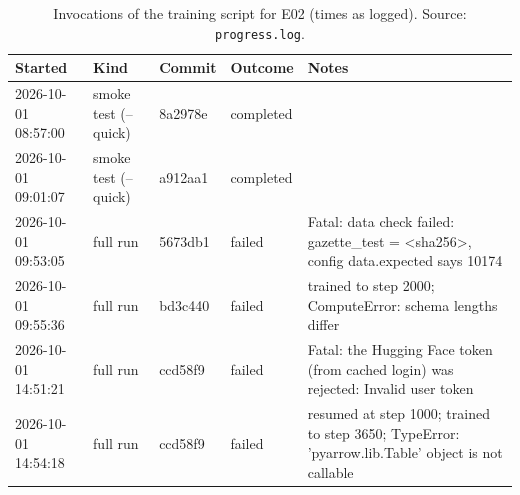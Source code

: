 \begin{table}[t]
\centering
\small
\begin{tabular}{lllll}
\toprule
Started & Kind & Commit & Outcome & Notes \\
\midrule
2026-10-01 08:57:00 & smoke test (--quick) & 8a2978e & completed &  \\
2026-10-01 09:01:07 & smoke test (--quick) & a912aa1 & completed &  \\
2026-10-01 09:53:05 & full run & 5673db1 & failed & Fatal: data check failed: gazette\_test = <sha256>, config data.expected says 10174 \\
2026-10-01 09:55:36 & full run & bd3c440 & failed & trained to step 2000; ComputeError: schema lengths differ \\
2026-10-01 14:51:21 & full run & ccd58f9 & failed & Fatal: the Hugging Face token (from cached login) was rejected: Invalid user token \\
2026-10-01 14:54:18 & full run & ccd58f9 & failed & resumed at step 1000; trained to step 3650; TypeError: 'pyarrow.lib.Table' object is not callable \\
\bottomrule
\end{tabular}
\caption{Invocations of the training script for E02 (times as logged). Source: \texttt{progress.log}.}
\label{tab:e02-invocations}
\end{table}
